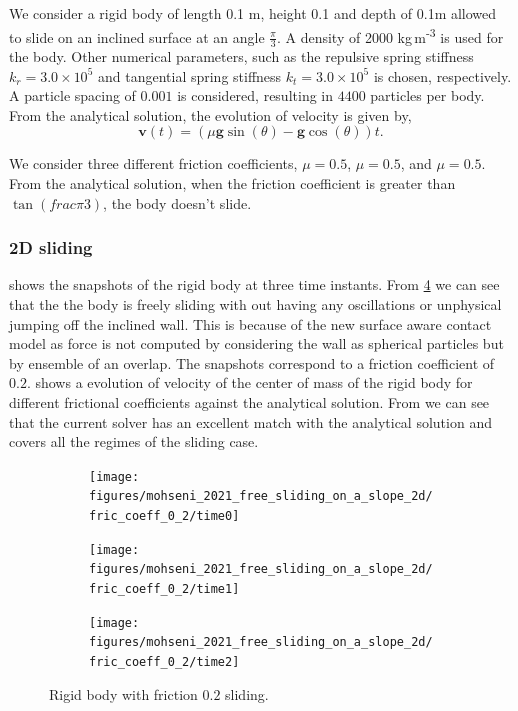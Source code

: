 \documentclass[preprint,12pt]{elsarticle}
\newcommand{\teng}[1]{\ensuremath{\boldsymbol{#1}}}
\newcommand{\ten}[1]{\ensuremath{\mathbf{#1}}}
\begin{document}
We consider a rigid body of length 0.1 m, height 0.1 and depth of 0.1m allowed
to slide on an inclined surface at an angle $\frac{\pi}{3}$. A density of 2000
kg\,m\textsuperscript{-3} is used for the body. Other numerical parameters,
such as the repulsive spring stiffness $k_r=3.0 \times 10^{5}$ and tangential
spring stiffness $k_t=3.0 \times 10^{5}$ is chosen, respectively. A particle
spacing of $0.001$ is considered, resulting in $4400$ particles per body. From
the analytical solution, the evolution of velocity is given by,
\begin{equation}
  \label{eq:ce}
  \ten{v}(t) = (\mu \teng{g} \sin (\theta) - \teng{g} \cos (\theta)) t.
\end{equation}


We consider three different friction coefficients, $\mu=0.5$, $\mu=0.5$, and
$\mu=0.5$. From the analytical solution, when the friction coefficient is
greater than $\tan(frac{\pi}{3})$, the body doesn't slide.

\subsubsection{2D sliding}
\label{sec:results-2d-sliding}

 shows the snapshots of the rigid body at
three time instants. From \cref{fig:mohseni-2021-sliding-2d} we can see that
the the body is freely sliding with out having any oscillations or unphysical
jumping off the inclined wall. This is because of the new surface aware
contact model as force is not computed by considering the wall as spherical
particles but by ensemble of an overlap. The snapshots correspond to a
friction coefficient of $0.2$.
 shows a evolution of
velocity of the center of mass of the rigid body for different frictional
coefficients against the analytical solution. From
 we can see that the current
solver has an excellent match with the analytical solution and covers all the
regimes of the sliding case.


\begin{figure}[!htpb]
  \centering
  \begin{subfigure}{0.48\textwidth}
    \centering
    \texttt{[image: figures/mohseni\_2021\_free\_sliding\_on\_a\_slope\_2d/fric\_coeff\_0\_2/time0]}
    \label{fig:passing-0}
  \end{subfigure}
  \begin{subfigure}{0.48\textwidth}
    \centering
    \texttt{[image: figures/mohseni\_2021\_free\_sliding\_on\_a\_slope\_2d/fric\_coeff\_0\_2/time1]}
    \label{fig:passing-1}
  \end{subfigure}

  \begin{subfigure}{0.48\textwidth}
    \centering
    \texttt{[image: figures/mohseni\_2021\_free\_sliding\_on\_a\_slope\_2d/fric\_coeff\_0\_2/time2]}
    \label{fig:passing-2}
  \end{subfigure}
  \caption{Rigid body with friction $0.2$ sliding.}
\label{fig:mohseni-2021-sliding-2d}
\end{figure}
\end{document}
